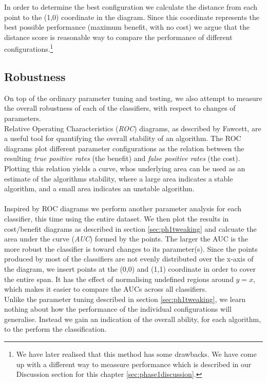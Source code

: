 %
In order to determine the best configuration we calculate the distance from each point to the (1,0) coordinate in the diagram. Since this coordinate represents the best possible performance (maximum benefit, with no cost) we argue that the distance score is reasonable way to compare the performance of different configurations.\footnote{We have later realised that this method has some drawbacks. We have come up with a different way to meassure performance which is described in our Discussion section for this chapter \ref{sec:phase1discussion}.}\\
%
\subsection{Robustness}\label{sec:robustness}
%
On top of the ordinary parameter tuning and testing, we also attempt to measure the overall robustness of each of the classifiers, with respect to changes of parameters.\\
Relative Operating Characteristics (\textit{ROC}) diagrams, as described by Fawcett\cite{Fawcett06a}, are a useful tool for quantifying the overall stability of an algorithm. The ROC diagrams plot different parameter configurations as the relation between the resulting \textit{true positive rates} (the benefit) and \textit{false positive rates} (the cost). Plotting this relation yields a curve, whos underlying area can be used as an estimate of the algorithms stability, where a large area indicates a stable algorithm, and a small area indicates an unstable algorithm.\\
\\
Inspired by ROC diagrams we perform another parameter analysis for each classifier, this time using the entire dataset. We then plot the results in cost/benefit diagrams as described in section \ref{sec:ph1tweaking} and calcuate the area under the curve (\textit{AUC}) formed by the points. The larger the AUC is the more robust the classifier is toward changes to its parameter(s). Since the points produced by most of the classifiers are not evenly distributed over the x-axis of the diagram, we insert points at the (0,0) and (1,1) coordinate in order to cover the entire span. It has the effect of normalising undefined regions around $y=x$, which makes it easier to compare the AUCs across all classifiers.\\
Unlike the parameter tuning described in section \ref{sec:ph1tweaking}, we learn nothing about how the performance of the individual configurations will generalise. Instead we gain an indication of the overall ability, for each algorithm, to the perform the classification.
%
